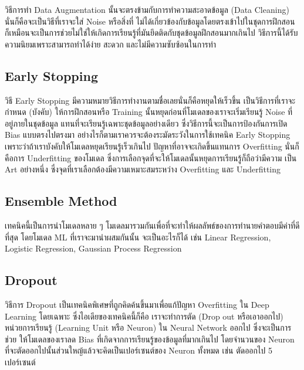 วิธีการทำ Data Augmentation นั้นจะตรงข้ามกับการทำความสะอาดข้อมูล (Data Cleaning) นั่นก็คือจะเป็นวิธีที่เราจะใส่ Noise หรือสิ่งที่%
ไม่ได้เกี่ยวข้องกับข้อมูลโดยตรงเข้าไปในชุดการฝึกสอน ก็เหมือนจะเป็นการช่วยไม่ใช่ให้เกิดการเรียนรู้ที่มันยึดติดกับชุดข้อมูลฝึกสอนมากเกินไป
วิธีการนี้ได้รับความนิยมเพราะสามารถทำได้ง่าย สะดวก และไม่มีความซับซ้อนในการทำ

\subsection{Early Stopping}

วิธี Early Stopping มีความหมายวิธีการทำงานตามชื่อเลยนั่นก็คือหยุดให้เร็วขึ้น เป็นวิธีการที่เราจะกำหนด (บังคับ) ให้การฝึกสอนหรือ Training 
นั้นหยุดก่อนที่โมเดลของเราจะเริ่มเรียนรู้ Noise ที่อยู่ภายในชุดข้อมูล แทนที่จะเรียนรู้เฉพาะชุดข้อมูลอย่างเดียว ซึ่งวิธีการนี้จะเป็นการป้องกันการเปิด 
Bias แบบตรงไปตรงมา อย่างไรก็ตามเราควรจะต้องระมัดระวังในการใช้เทคนิค Early Stopping เพราะว่าถ้าเราบังคับให้โมเดลหยุดเรียนรู้เร็วเกินไป
ปัญหาที่อาจจะเกิดขึ้นแทนการ Overfitting นั่นก็คือการ Underfitting ของโมเดล ซึ่งการเลือกจุดที่จะให้โมเดลนั้นหยุดการเรียนรู้ก็ถือว่ามีความ%
เป็น Art อย่างหนึ่ง ซึ่งจุดที่เราเลือกต้องมีความเหมาะสมระหว่าง Overfitting และ Underfitting

\subsection{Ensemble Method}

เทคนิคนี้เป็นการนำโมเดลหลาย ๆ โมเดลมารวมกันเพื่อที่จะทำให้ผลลัพธ์ของการทำนายคำตอบมีค่าที่ดีที่สุด โดยโมเดล ML ที่เราจะมานำผสมกันนั้น%
จะเป็นอะไรก็ได้ เช่น Linear Regression, Logistic Regression, Gaussian Process Regression


\subsection{Dropout}

วิธีการ Dropout เป็นเทคนิคพิเศษที่ถูกคิดค้นขึ้นมาเพื่อแก้ปัญหา Overfitting ใน Deep Learning โดยเฉพาะ ซึ่งไอเดียของเทคนิคนี้ก็คือ%
เราจะทำการตัด (Drop out หรือเอาออกไป) หน่วยการเรียนรู้ (Learning Unit หรือ Neuron) ใน Neural Network ออกไป ซึ่งจะเป็นการช่วย%
ให้โมเดลของเราลด Bias ที่เกิดจากการเรียนรู้ของข้อมูลที่มากเกินไป โดยจำนวนของ Neuron ที่จะตัดออกไปนั้นส่วนใหญ้แล้วจะคิดเป็นเปอร์เซนต์ของ
Neuron ทั้งหมด เช่น ตัดออกไป 5 เปอร์เซนต์

